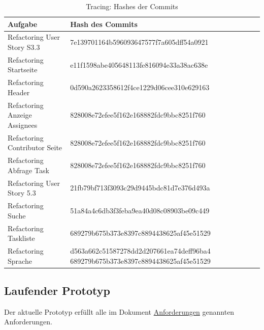 \documentclass[a4paper,11pt]{article}
\begin{document}
\begin{table}[H]
	\centering
	\small
	\renewcommand{\arraystretch}{1.4}
	\begin{tabular}{| p{4.5cm} | p{9cm} |}
		\hline
		\textbf{Aufgabe}              & \textbf{Hash des Commits}                                                         \\
		\hline
		Refactoring User Story S3.3   & 7e139701164b596093647577f7a605dff54a0921                                          \\
		\hline
		Refactoring Startseite        & e11f1598abe405648113fe816094e33a38ac638e                                          \\
		\hline
		Refactoring Header            & 0d590a2623358612f4ce1229d06cee310e629163                                          \\
		\hline
		Refactoring Anzeige Assignees & 828008e72efee5f162e168882fdc9bbc8251f760                                          \\
		\hline
		Refactoring Contributor Seite & 828008e72efee5f162e168882fdc9bbc8251f760                                          \\
		\hline
		Refactoring Abfrage Task      & 828008e72efee5f162e168882fdc9bbc8251f760                                          \\
		\hline
		Refactoring User Story 5.3    & 21fb79bf713f3093c29d9445bdc81d7e376d493a                                          \\
		\hline
		Refactoring Suche             & 51a84a4c6db3f3feba9ea40d08c08903be09c449                                          \\
		\hline
		Refactoring Taskliste         & 689279b675b373e8397c8894438625af45e51529                                          \\
		\hline
		Refactoring Sprache           & d563a662c51587278dd2d207661ea74deff96ba4 689279b675b373e8397c8894438625af45e51529 \\
		\hline
	\end{tabular}
	\caption{Tracing: Hashes der Commits}
	\label{tab:tracing}
\end{table}

\subsection{Laufender Prototyp}
Der aktuelle Prototyp erfüllt alle im Dokument \href{https://git.informatik.uni-rostock.de/softwaretechnik-ws-2025-26/uebung3/team3/projekt-team3-uebung3/-/blob/main/anforderungen/anforderungen.pdf?ref_type=heads}{Anforderungen} genannten Anforderungen.
\end{document}
